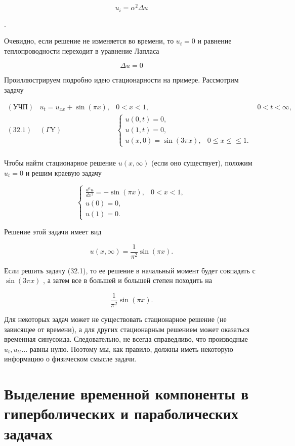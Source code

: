 \documentclass[
  ukrainian,
]{article}
\begin{document}
\[
u_i = \alpha^2 \Delta u
\]

.

Очевидно, если решение не изменяется во времени, то \(u_t = 0\) и
равнение теплопроводности переходит в уравнение Лапласа

\[
\Delta u = 0
\]

Проиллюстрируем подробно идею стационарности на примере. Рассмотрим
задачу

\[
\begin{array}{llll} (\text{УЧП}) & u_t = u_{xx} + \sin{(\pi x)}, & 0 < x < 1, & 0 < t < \infty, \\ (32.1) & (\Gamma \text{Y}) & \begin{cases} u(0, t) = 0, \\ u(1, t) = 0, \\ u(x, 0) = \sin{(3\pi x)}, & 0 \le x \le \le 1. \end{cases} \\ \end{array}
\]

Чтобы найти стационарное решение \(u\left(x,\infty\right)\) (если оно
существует), положим \(u_{t}\!=\!0\) и решим краевую задачу

\[
\begin{cases} \frac{d^{2}u}{dx^{2}} = -\sin(\pi x), & 0 < x < 1, \\ u(0) = 0, \\ u(1) = 0. \end{cases}
\]

Решение этой задачи имеет вид

\[
u(x, \infty) = \frac{1}{\pi^2} \sin{(\pi x)}.
\]

Если решить задачу (32.1), то ее решение в начальный момент будет
совпадать с \(\sin{(3\pi x)}\) , а затем все в большей и большей степен
походить на

\[
\frac{1}{\pi^2}\sin{(\pi x)}.
\]

Для некоторых задач может не существовать стационарное решение (не
зависящее от времени), а для других стационарным решением может
оказаться временная синусоида. Следовательно, не всегда справедливо, что
производные \(u_t, u_{tt} \dots\) равны нулю. Поэтому мы, как правило,
должны иметь некоторую информацию о физическом смысле задачи.

\section{Выделение временной компоненты в гиперболических и
параболических
задачах}\label{ux432ux44bux434ux435ux43bux435ux43dux438ux435-ux432ux440ux435ux43cux435ux43dux43dux43eux439-ux43aux43eux43cux43fux43eux43dux435ux43dux442ux44b-ux432-ux433ux438ux43fux435ux440ux431ux43eux43bux438ux447ux435ux441ux43aux438ux445-ux438-ux43fux430ux440ux430ux431ux43eux43bux438ux447ux435ux441ux43aux438ux445-ux437ux430ux434ux430ux447ux430ux445}
\end{document}
